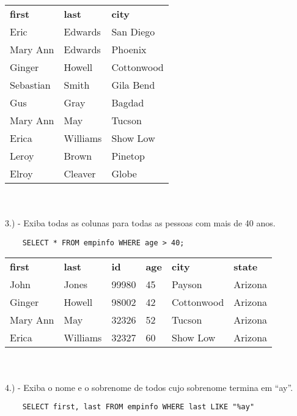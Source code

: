\begin{tabular}{l l l}
    {\textbf{first}} & {\textbf{last}} & {\textbf{city}} \\
    {Eric}           & {Edwards}       & {San Diego}     \\
    {Mary Ann}       & {Edwards}       & {Phoenix}       \\
    {Ginger}         & {Howell}        & {Cottonwood}    \\
    {Sebastian}      & {Smith}         & {Gila Bend}     \\
    {Gus}            & {Gray}          & {Bagdad}        \\
    {Mary Ann}       & {May}           & {Tucson}        \\
    {Erica}          & {Williams}      & {Show Low}      \\
    {Leroy}          & {Brown}         & {Pinetop}       \\
    {Elroy}          & {Cleaver}       & {Globe}        
\end{tabular} \\ \\

3.) - Exiba todas as colunas para todas as pessoas com mais de 40 anos.

\begin{lstlisting}
    SELECT * FROM empinfo WHERE age > 40;
\end{lstlisting}

\begin{tabular}{l l l l l l}
{\textbf{first}} & {\textbf{last}} & {\textbf{id}} & {\textbf{age}} & {\textbf{city}} & {\textbf{state}} \\
{John}           & {Jones}         & {99980}       & {45}           & {Payson}        & {Arizona}        \\
{Ginger}         & {Howell}        & {98002}       & {42}           & {Cottonwood}    & {Arizona}        \\
{Mary Ann}       & {May}           & {32326}       & {52}           & {Tucson}        & {Arizona}        \\
{Erica}          & {Williams}      & {32327}       & {60}           & {Show Low}      & {Arizona}       
\end{tabular} \\ \\ 

4.) - Exiba o nome e o sobrenome de todos cujo sobrenome termina em “ay”.

\begin{lstlisting}
    SELECT first, last FROM empinfo WHERE last LIKE "%ay"
\end{lstlisting}

